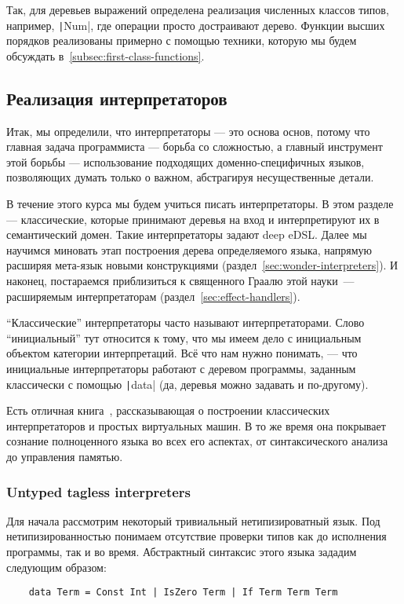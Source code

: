 Так, для деревьев выражений определена реализация численных классов типов, например, \texttt|Num|, где операции просто достраивают дерево.
Функции высших порядков реализованы примерно с помощью техники, которую мы будем обсуждать в~\ref{subsec:first-class-functions}.


\subsection{Реализация интерпретаторов}

Итак, мы определили, что интерпретаторы --- это основа основ, потому что главная задача программиста --- борьба со сложностью, а главный инструмент этой борьбы --- использование подходящих доменно-специфичных языков, позволяющих думать только о важном, абстрагируя несущественные детали.

В течение этого курса мы будем учиться писать интерпретаторы.
В этом разделе --- классические, которые принимают деревья на вход и интерпретируют их в семантический домен.
Такие интерпретаторы задают deep eDSL\@.
Далее мы научимся миновать этап построения дерева определяемого языка, напрямую расширяя мета-язык новыми конструкциями (раздел~\ref{sec:wonder-interpreters}).
И наконец, постараемся приблизиться к священного Граалю этой науки~--- расширяемым интерпретаторам (раздел~\ref{sec:effect-handlers}).

``Классические'' интерпретаторы часто называют  интерпретаторами.
Слово ``инициальный'' тут относится к тому, что мы имеем дело с инициальным объектом категории интерпретаций.
Всё что нам нужно понимать, --- что инициальные интерпретаторы работают с деревом программы, заданным классически с помощью \texttt|data| (да, деревья можно задавать и по-другому).

Есть отличная книга~\cite{nystrom2021crafting}, рассказывающая о построении классических интерпретаторов и простых виртуальных машин.
В то же время она покрывает сознание полноценного языка во всех его аспектах, от синтаксического анализа до управления памятью.

\subsubsection{Untyped tagless interpreters}

Для начала рассмотрим некоторый тривиальный нетипизироватный язык.
Под нетипизированностью понимаем отсутствие проверки типов как до исполнения программы, так и во время.
Абстрактный синтаксис этого языка зададим следующим образом:
\begin{verbatim}
    data Term = Const Int | IsZero Term | If Term Term Term
\end{verbatim}

